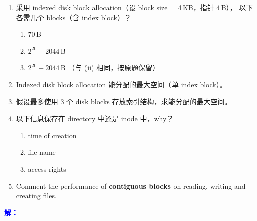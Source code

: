 \documentclass[11pt,a4paper]{article}
\newcommand{\ans}{\par\noindent\textcolor{blue}{\textbf{解：}}}
\begin{document}
\begin{enumerate}[label=(\alph*),leftmargin=*]
  \item 采用 indexed disk block allocation（设 block size = 4\,KB，指针 4\,B），
        以下各需几个 blocks（含 index block）？
        \begin{enumerate}[label=(\roman*)]
          \item 70\,B
          \item $2^{20} + 2044$\,B
          \item $2^{20} + 2044$\,B （与 (ii) 相同，按原题保留）
        \end{enumerate}
  \item Indexed disk block allocation 能分配的最大空间（单 index block）。
  \item 假设最多使用 3 个 disk blocks 存放索引结构，求能分配的最大空间。
  \item 以下信息保存在 directory 中还是 inode 中，why？
        \begin{enumerate}[label=(\roman*)]
          \item time of creation
          \item file name
          \item access rights
        \end{enumerate}
  \item Comment the performance of \textbf{contiguous blocks}
        on reading, writing and creating files.
\end{enumerate}

\ans
\end{document}
